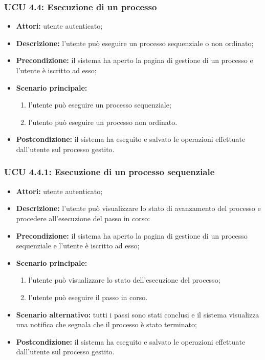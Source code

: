 \subsubsection{UCU 4.4: Esecuzione di un processo}
\begin{itemize}
\item \textbf{Attori:} utente autenticato;
\item \textbf{Descrizione:} l'utente può eseguire un processo sequenziale o non ordinato;
\item \textbf{Precondizione:} il sistema ha aperto la pagina di gestione di un processo e l'utente è iscritto ad esso;
\item \textbf{Scenario principale:}\
\begin{enumerate}
\item l'utente può eseguire un processo sequenziale;
\item l'utento può eseguire un processo non ordinato.
\end{enumerate}
\item \textbf{Postcondizione:} il sistema ha eseguito e salvato le operazioni effettuate dall'utente sul processo gestito.
\end{itemize}

\subsubsection{UCU 4.4.1: Esecuzione di un processo sequenziale}
\begin{itemize}
\item \textbf{Attori:} utente autenticato;
\item \textbf{Descrizione:} l'utente può visualizzare lo stato di avanzamento del processo e procedere all'esecuzione del passo in corso:
\item \textbf{Precondizione:} il sistema ha aperto la pagina di gestione di un processo sequenziale e l'utente è iscritto ad esso;
\item \textbf{Scenario principale:}
\begin{enumerate}
\item l'utente può visualizzare lo stato dell'esecuzione del processo;
\item l'utente può eseguire il passo in corso.
\end{enumerate}
\item \textbf{Scenario alternativo:} tutti i passi sono stati conclusi e il sistema visualizza una notifica che segnala che il processo è stato terminato; 
\item \textbf{Postcondizione:} il sistema ha eseguito e salvato le operazioni effettuate dall'utente sul processo gestito.
\end{itemize}

